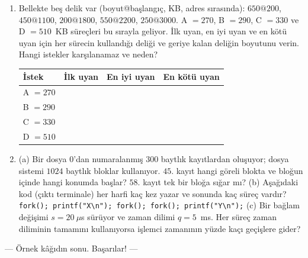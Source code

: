 \begin{enumerate}[leftmargin=2.0em,label=C\arabic*.,itemsep=0.5em]
  \newpage
  \item {} Bellekte beş delik var (boyut@başlangıç, KB, adres sırasında): $650@200$, $450@1100$, $200@1800$, $550@2200$, $250@3000$. A $= 270$, B $= 290$, C $= 330$ ve D $= 510$~KB süreçleri bu sırayla geliyor. İlk uyan, en iyi uyan ve en kötü uyan için her sürecin kullandığı deliği ve geriye kalan deliğin boyutunu verin. Hangi istekler karşılanamaz ve neden?
  \begin{center}
  \renewcommand{\arraystretch}{2.0}
  \begin{tabular}{|l|p{4.0cm}|p{4.0cm}|p{4.0cm}|}
  \hline
  \textbf{İstek} & \textbf{İlk uyan} & \textbf{En iyi uyan} & \textbf{En kötü uyan} \\ \hline
  A $= 270$ &&& \\ \hline
  B $= 290$ &&& \\ \hline
  C $= 330$ &&& \\ \hline
  D $= 510$ &&& \\ \hline
  \end{tabular}
  \end{center}
  \ans{2.0cm}

  \item {}
  (a) Bir dosya $0$'dan numaralanmış $300$ baytlık kayıtlardan oluşuyor; dosya sistemi $1024$ baytlık bloklar kullanıyor. $45$. kayıt hangi göreli blokta ve bloğun içinde hangi konumda başlar? $58$. kayıt tek bir bloğa sığar mı? 
  \ans{3.0cm}
  (b) Aşağıdaki kod (çıktı terminale) her harfi kaç kez yazar ve sonunda kaç süreç vardır? \\
  \texttt{fork(); printf("X\textbackslash n"); fork(); fork(); printf("Y\textbackslash n");}
  \ans{2.2cm}
  (c) Bir bağlam değişimi $s = 20\ \mu$s sürüyor ve zaman dilimi $q = 5$~ms. Her süreç zaman diliminin tamamını kullanıyorsa işlemci zamanının yüzde kaçı geçişlere gider? 
  \ans{2.0cm}
\end{enumerate}

\vfill
\begin{center}\small\color{muted}--- Örnek kâğıdın sonu. Başarılar! ---\end{center}
